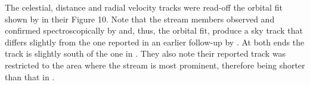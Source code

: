 The celestial, distance and radial velocity tracks were read-off the orbital fit 
shown by \citet{Fu2018} in their Figure 10. Note that the stream members observed and confirmed spectroscopically by \citet{Fu2018} and, thus, the orbital fit, produce a sky track that differs slightly from the one reported in an earlier follow-up by \citet{Bernard2016}. At both ends the \citet{Bernard2016}  track is slightly south of the one in \citet{Fu2018}. 
They also note their reported track was restricted to the area where the stream is most prominent, 
therefore being shorter than that in \citet{Bernard2016}.
